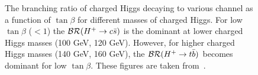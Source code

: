 \begin{figure}
    \centering  
    \vfil
\caption{The branching ratio of charged Higgs decaying to various channel as a function of
$\tan\beta$ for different masses of charged Higgs. For low $\tan\beta$ ($<1$) the
${\cal{BR}}(H^+\rightarrow c \bar{s})$ is the dominant at lower charged Higgs masses (100 GeV, 120
GeV). However, for higher charged Higgs masses (140 GeV, 160 GeV), the 
${\cal{BR}}(H^+\rightarrow t \bar{b})$ becomes dominant for low $\tan\beta$. These figures are 
taken from~\cite{HplusBR}.}
\label{fig:charged_higgs_br}
\end{figure}

